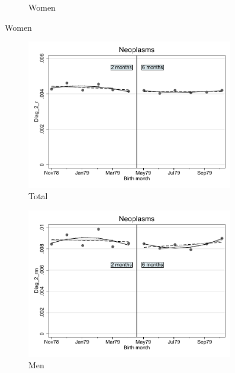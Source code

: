\documentclass[a4paper ]{article}
\begin{document}
\begin{figure}[h!]
\begin{subfigure}[t]{0.31\textwidth}
		\caption{Women}
	\end{subfigure}
\end{figure}
\newpage
\begin{figure}[h]
	\centering
	\begin{subfigure}[t]{0.31\textwidth}
		\centering
		\includegraphics[width=0.99\textwidth]{R1_RD_Diag_2_r_fits}
		\caption{Total}		
	\end{subfigure}
	\begin{subfigure}[t]{0.31\textwidth}
		\centering
		\includegraphics[width=0.99\textwidth]{R1_RD_Diag_2_rm_fits}
		\caption{Men}		
	\end{subfigure}
	\quad
	\begin{subfigure}[t]{0.31\textwidth}

\end{subfigure}
\end{figure}
\end{document}
